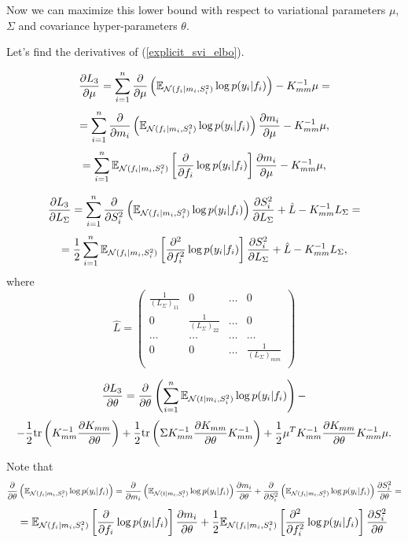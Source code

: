 Now we can maximize this lower bound with respect to variational parameters $\mu$, $\Sigma$ and covariance hyper-parameters $\theta$.

Let's find the derivatives of (\ref{explicit_svi_elbo}).

$$\frac{\partial L_3}{\partial \mu} = \sum_{i=1}^n \frac{\partial }{\partial \mu} \left(\mathbb{E}_{\mathcal{N}(f_i | m_i, S_i^2)} \log p(y_i | f_i)\right) - K_{mm}^{-1} \mu = $$
$$ = \sum_{i=1}^n \frac{\partial }{\partial m_i} \left(\mathbb{E}_{\mathcal{N}(f_i | m_i, S_i^2)} \log p(y_i | f_i)\right) \frac{\partial m_i}{\partial \mu} - K_{mm}^{-1} \mu,$$
$$ = \sum_{i=1}^n \mathbb{E}_{\mathcal{N}(f_i | m_i, S_i^2)}\left[ \frac{\partial }{\partial f_i} \log p(y_i | f_i)\right] \frac{\partial m_i}{\partial \mu} - K_{mm}^{-1} \mu,$$

$$\frac{\partial L_3}{\partial L_{\Sigma}} = \sum_{i=1}^n \frac{\partial }{\partial S_i^2}\left( \mathbb{E}_{\mathcal{N}(f_i | m_i, S_i^2)} \log p(y_i | f_i)\right) \frac{\partial S_i^2}{\partial L_{\Sigma}} + \hat L - K_{mm}^{-1} L_{\Sigma} = $$
$$= \frac 1 2 \sum_{i=1}^n \mathbb{E}_{\mathcal{N}(f_i | m_i, S_i^2)}\left[ \frac{\partial ^2}{\partial f_i^2} \log p(y_i | f_i)\right] \frac{\partial S_i^2}{\partial L_{\Sigma}} + \hat L - K_{mm}^{-1} L_{\Sigma},$$
where
$$\hat L = 
\left(
\begin{array}{cccc}
\frac 1 {(L_{\Sigma})_{11}} & 0 & \ldots & 0\\
0 & \frac 1 {(L_{\Sigma})_{22}} & \ldots & 0\\
\ldots & \ldots & \ldots & \ldots\\
0 & 0 & \ldots & \frac 1 {(L_{\Sigma})_{mm}} \\
\end{array}   
\right) $$


$$\frac{\partial L_3}{\partial \theta} = \frac{\partial }{\partial \theta} \left(\sum_{i=1}^n \mathbb{E}_{\mathcal{N}(t | m_i, S_i^2)}  \log p(y_i | f_i)\right) -$$
$$- \frac 1 2 \mbox{tr}\left(K_{mm}^{-1} \frac{\partial K_{mm}}{\partial \theta}\right) + \frac 1 2 \mbox{tr}\left(\Sigma K_{mm}^{-1} \frac{\partial K_{mm}}{\partial \theta} K_{mm}^{-1} \right)+ \frac 1 2 \mu^T K_{mm}^{-1} \frac{\partial K_{mm}}{\partial \theta} K_{mm}^{-1}\mu.$$

Note that
$$\frac{\partial }{\partial \theta} \left(\mathbb{E}_{\mathcal{N}(f_i | m_i, S_i^2)} \log p(y_i | f_i)\right) = \frac{\partial }{\partial m_i}\left(\mathbb{E}_{\mathcal{N}(t | m_i, S_i^2)}  \log p(y_i | f_i) \right)\frac{\partial m_i}{\partial \theta} + \frac{\partial }{\partial S_i^2}\left(\mathbb{E}_{\mathcal{N}(f_i | m_i, S_i^2)}  \log p(y_i | f_i) \right)\frac{\partial S_i^2}{\partial \theta} = $$
$$ = \mathbb{E}_{\mathcal{N}(f_i | m_i, S_i^2)} \left[\frac{\partial }{\partial f_i} \log p(y_i | f_i) \right] \frac{\partial m_i}{\partial \theta} + \frac 1 2 \mathbb{E}_{\mathcal{N}(f_i | m_i, S_i^2)} \left[\frac{\partial ^2}{\partial f_i^2} \log p(y_i | f_i) \right] \frac{\partial S_i^2}{\partial \theta}$$

